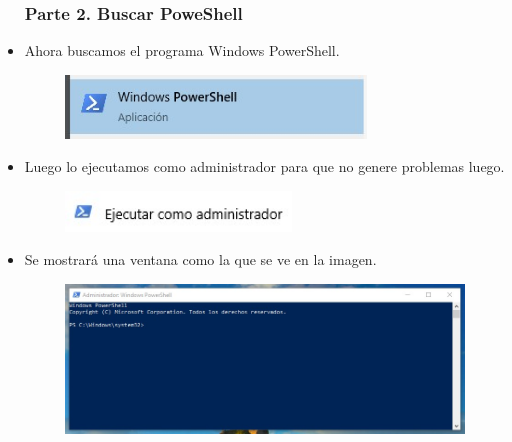 \begin{itemize}
			\subsubsection{Parte 2. Buscar PoweShell}
				\item Ahora buscamos el programa Windows PowerShell.
					\begin{figure}[htb]
						\begin{center}
							\includegraphics[width=8cm]{./Imagenes/BuscarPowerShell}
						\end{center}
					\end{figure}
					\vspace{8cm}
				\item Luego lo ejecutamos como administrador para que no genere problemas luego.
					\begin{figure}[htb]
						\begin{center}
							\includegraphics[width=6cm]{./Imagenes/EjecutarComoAdministrador}
						\end{center}
					\end{figure}
				\item Se mostrará una ventana como la que se ve en la imagen.
					\begin{figure}[htb]
						\begin{center}
							\includegraphics[width=16cm]{./Imagenes/InicioPowerShell}
						\end{center}
					\end{figure}

\end{itemize}
